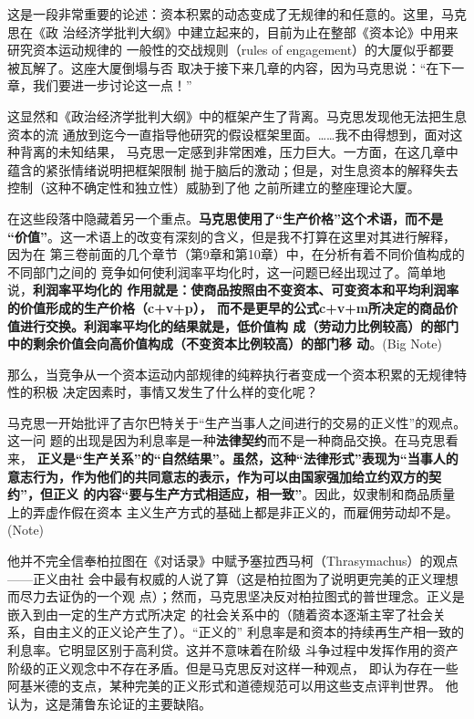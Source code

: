 这是一段非常重要的论述：资本积累的动态变成了无规律的和任意的。这里，马克思在《政
治经济学批判大纲》中建立起来的，目前为止在整部《资本论》中用来研究资本运动规律的
一般性的交战规则（rules of engagement）的大厦似乎都要被瓦解了。这座大厦倒塌与否
取决于接下来几章的内容，因为马克思说：“在下一章，我们要进一步讨论这一点！”

这显然和《政治经济学批判大纲》中的框架产生了背离。马克思发现他无法把生息资本的流
通放到迄今一直指导他研究的假设框架里面。……我不由得想到，面对这种背离的未知结果，
马克思一定感到非常困难，压力巨大。一方面，在这几章中蕴含的紧张情绪说明把框架限制
抛于脑后的激动；但是，对生息资本的解释失去控制（这种不确定性和独立性）威胁到了他
之前所建立的整座理论大厦。

在这些段落中隐藏着另一个重点。\textbf{马克思使用了“生产价格”这个术语，而不是
“价值”}。这一术语上的改变有深刻的含义，但是我不打算在这里对其进行解释，因为在
第三卷前面的几个章节（第9章和第10章）中，在分析有着不同价值构成的不同部门之间的
竞争如何使利润率平均化时，这一问题已经出现过了。简单地说，\textbf{利润率平均化的
作用就是：使商品按照由不变资本、可变资本和平均利润率的价值形成的生产价格（c+v+p），
而不是更早的公式c+v+m所决定的商品价值进行交换。利润率平均化的结果就是，低价值构
成（劳动力比例较高）的部门中的剩余价值会向高价值构成（不变资本比例较高）的部门移
动}。(Big Note)

那么，当竞争从一个资本运动内部规律的纯粹执行者变成一个资本积累的无规律特性的积极
决定因素时，事情又发生了什么样的变化呢？

马克思一开始批评了吉尔巴特关于“生产当事人之间进行的交易的正义性”的观点。这一问
题的出现是因为利息率是一种\textbf{法律契约}而不是一种商品交换。在马克思看来，
\textbf{正义是“生产关系”的“自然结果”。虽然，这种“法律形式”表现为“当事人的
意志行为，作为他们的共同意志的表示，作为可以由国家强加给立约双方的契约”，但正义
的内容“要与生产方式相适应，相一致”}。因此，奴隶制和商品质量上的弄虚作假在资本
主义生产方式的基础上都是非正义的，而雇佣劳动却不是。
(Note)

他并不完全信奉柏拉图在《对话录》中赋予塞拉西马柯（Thrasymachus）的观点——正义由社
会中最有权威的人说了算（这是柏拉图为了说明更完美的正义理想而尽力去证伪的一个观
点）；然而，马克思坚决反对柏拉图式的普世理念。正义是嵌入到由一定的生产方式所决定
的社会关系中的（随着资本逐渐主宰了社会关系，自由主义的正义论产生了）。“正义的”
利息率是和资本的持续再生产相一致的利息率。它明显区别于高利贷。这并不意味着在阶级
斗争过程中发挥作用的资产阶级的正义观念中不存在矛盾。但是马克思反对这样一种观点，
即认为存在一些阿基米德的支点，某种完美的正义形式和道德规范可以用这些支点评判世界。
他认为，这是蒲鲁东论证的主要缺陷。

